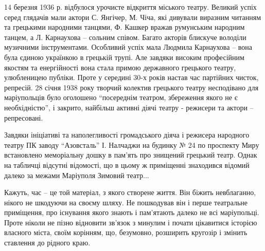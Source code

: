 14 березня 1936 р. відбулося урочисте відкриття міського театру. Великий успіх
серед глядачів мали актори С. Янгічер, М. Чіча, які дивували виразним читанням
та грецькими народними танцями, Ф. Кашкер вражав румунським народним танцем, а
Л. Карнаухова – сольним співом. Багато акторів блискуче володіли музичними
інструментами. Особливий успіх мала Людмила Карнаухова – вона була єдиною
українкою в грецькій трупі. Але завдяки високим професійним якостям та
енергійності вона стала примою державного грецького театру, улюбленицею
публіки. Проте у середині 30-х років настав час партійних чисток, репресій. 28
січня 1938 року творчий колектив грецького театру несподівано для маріупольців
було оголошено \enquote{посереднім театром, збереження якого не є необхідністю}, і
закрито, найбільш активні діячі театру - режисери та актори – репресовані.


Завдяки ініціативі та наполегливості громадського діяча і режисера народного
театру ПК заводу \enquote{Азовсталь} І. Налчаджи на будинку № 24 по проспекту Миру
встановлено меморіальну дошку в пам'ять про знищений грецький театр. Однак на
табличці відсутні відомості, що в цьому ж приміщенні знаходився відомий далеко
за межами Маріуполя Зимовий театр...

Кажуть, час – це той матеріал, з якого створене життя. Він біжить невблаганно,
нікого не шкодуючи на своєму шляху. Не пошкодував він і перше театральне
приміщення, про існування якого знають і пам'ятають далеко не всі маріупольці.
Проте ніколи не пізно відновити зв'язок з минулим і почати цікавитися історією
власного міста, своїм корінням, що, безумовно, розширить кругозір і змінить
ставлення до рідного краю. 
